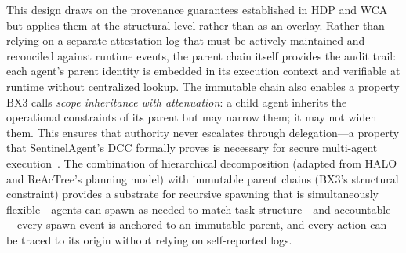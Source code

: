 This design draws on the provenance guarantees established in HDP and WCA but applies them at the structural level rather than as an overlay. Rather than relying on a separate attestation log that must be actively maintained and reconciled against runtime events, the parent chain itself provides the audit trail: each agent's parent identity is embedded in its execution context and verifiable at runtime without centralized lookup. The immutable chain also enables a property BX3 calls \emph{scope inheritance with attenuation}: a child agent inherits the operational constraints of its parent but may narrow them; it may not widen them. This ensures that authority never escalates through delegation---a property that SentinelAgent's DCC formally proves is necessary for secure multi-agent execution~\cite{sentinelagent2026}. The combination of hierarchical decomposition (adapted from HALO and ReAcTree's planning model) with immutable parent chains (BX3's structural constraint) provides a substrate for recursive spawning that is simultaneously flexible---agents can spawn as needed to match task structure---and accountable---every spawn event is anchored to an immutable parent, and every action can be traced to its origin without relying on self-reported logs.

